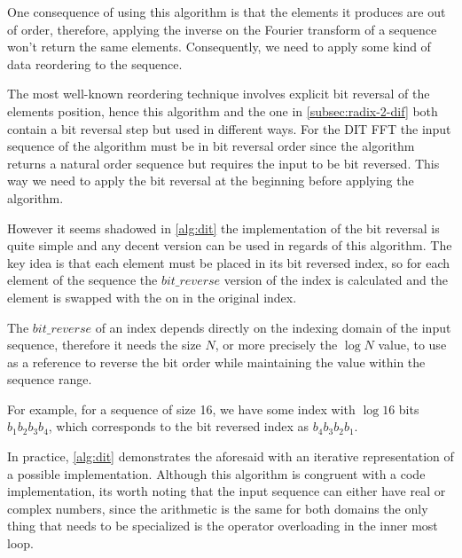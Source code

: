 \documentclass[
  oneside,
  11pt, a4paper,
  footinclude=true,
  headinclude=true,
  cleardoublepage=empty
]{scrbook}
\begin{document}
One consequence of using this algorithm is that the elements it produces are out of order, therefore, applying the inverse on the Fourier transform of a sequence won't return the same elements. Consequently, we need to apply some kind of data reordering to the sequence.

The most well-known reordering technique involves explicit bit reversal of the elements position, hence this algorithm and the one in \autoref{subsec:radix-2-dif} both contain a bit reversal step but used in different ways. For the DIT FFT  the input sequence of the algorithm must be in bit reversal order since the algorithm returns a natural order sequence but requires the input to be bit reversed. This way we need to apply the bit reversal at the beginning before applying the algorithm.

However it seems shadowed in \autoref{alg:dit} the implementation of the bit reversal is quite simple and any decent version can be used in regards of this algorithm. The key idea is that each element must be placed in its bit reversed index, so for each element of the sequence the $bit\_reverse$ version of the index is calculated and the element is swapped with the on in the original index.

The $bit\_reverse$ of an index depends directly on the indexing domain of the input sequence, therefore it needs the size $N$, or more precisely the $\log{N}$ value, to use as a reference to reverse the bit order while maintaining the value within the sequence range.

For example, for a sequence of size 16, we have some index with $\log{16}$ bits $b_1 b_2 b_3 b_4$, which corresponds to the bit reversed index as $b_4 b_3 b_2 b_1$.
\newline

In practice, \autoref{alg:dit} demonstrates the aforesaid with an iterative representation of a possible implementation. Although this algorithm is congruent with a code implementation, its worth noting that the input sequence can either have real or complex numbers, since the arithmetic is the same for both domains the only thing that needs to be specialized is the operator overloading in the inner most loop. \newline
\newline

\break
\end{document}
